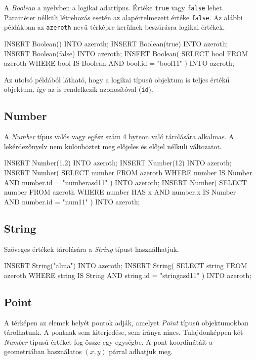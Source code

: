 A \textit{Boolean} a nyelvben a logikai adattípus. Értéke \texttt{true} vagy \texttt{false} lehet. Paraméter nélküli létrehozás esetén az alapértelmezett értéke \texttt{false}. Az alábbi példákban az \texttt{azeroth} nevű térképre kerülnek beszúrásra logikai értékek.

\begin{sql}
INSERT Boolean() INTO azeroth;
INSERT Boolean(true) INTO azeroth; 
INSERT Boolean(false) INTO azeroth;
INSERT Boolean(
    SELECT bool FROM azeroth
    WHERE bool IS Boolean AND bool.id = "bool11"
) INTO azeroth;
\end{sql}

Az utolsó példából látható, hogy a logikai típusú objektum is teljes értékű objektum, így az is rendelkezik azonosítóval (\texttt{id}).

\subsection{Number}

A \textit{Number} típus valós vagy egész szám 4 byteon való tárolására alkalmas. A lekérdezőnyelv nem különböztet meg előjeles és előjel nélküli változatot.

\begin{sql}
INSERT Number(1.2) INTO azeroth;
INSERT Number(12) INTO azeroth;
INSERT Number(
    SELECT number FROM azeroth
    WHERE number IS Number AND number.id = "numberasd11"
) INTO azeroth;
INSERT Number(
    SELECT number FROM azeroth
    WHERE number HAS x AND number.x IS Number AND number.id = "num11"
) INTO azeroth;
\end{sql}

\subsection{String}

Szöveges értékek tárolására a \textit{String} típust használhatjuk.

\begin{sql}
INSERT String("alma") INTO azeroth;
INSERT String(
    SELECT string FROM azeroth
    WHERE string IS String AND string.id = "stringasd11"
)
INTO azeroth;
\end{sql}

\subsection{Point}

A térképen az elemek helyét pontok adják, amelyet \textit{Point} típusú objektumokban tárolhatunk. A pontnak sem kiterjedése, sem iránya nincs. Tulajdonképpen két \textit{Number} típusú értéket fog össze egy egységbe. A pont koordinátáit a geometriában használatos $(x, y)$ párral adhatjuk meg.


